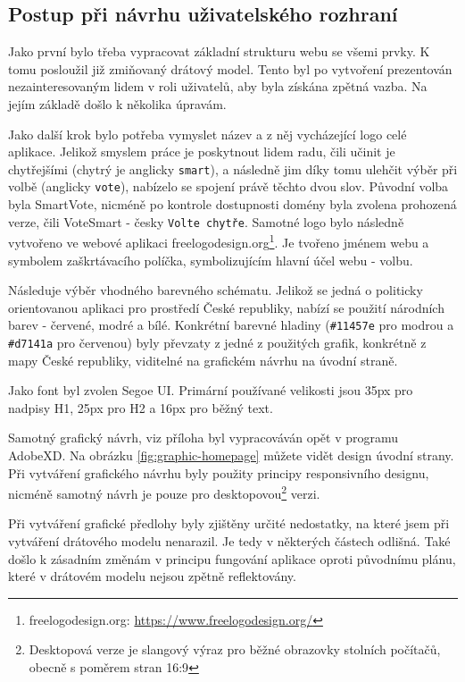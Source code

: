 \subsection{Postup při návrhu uživatelského rozhraní}
Jako první bylo třeba vypracovat základní strukturu webu se všemi prvky. K tomu posloužil již zmiňovaný drátový model. Tento byl po vytvoření prezentován nezainteresovaným lidem v roli uživatelů, aby byla získána zpětná vazba. Na jejím základě došlo k několika úpravám.
\par Jako další krok bylo potřeba vymyslet název a z něj vycházející logo celé aplikace. Jelikož smyslem práce je poskytnout lidem radu, čili učinit je chytřejšími (chytrý je anglicky \texttt{smart}), a následně jim díky tomu ulehčit výběr při volbě (anglicky \texttt{vote}), nabízelo se spojení právě těchto dvou slov. Původní volba byla SmartVote, nicméně po kontrole dostupnosti domény byla zvolena prohozená verze, čili VoteSmart - česky \texttt{Volte chytře}. Samotné logo bylo následně vytvořeno ve webové aplikaci freelogodesign.org\footnote{freelogodesign.org: \url{https://www.freelogodesign.org/}}. Je tvořeno jménem webu a symbolem zaškrtávacího políčka, symbolizujícím hlavní účel webu - volbu.
\par Následuje výběr vhodného barevného schématu. Jelikož se jedná o politicky orientovanou aplikaci pro prostředí České republiky, nabízí se použití národních barev - červené, modré a bílé. Konkrétní barevné hladiny (\texttt{\#11457e} pro modrou a \texttt{\#d7141a} pro červenou) byly převzaty z jedné z použitých grafik, konkrétně z mapy České republiky\cite{grafika-mapa}, viditelné na grafickém návrhu na úvodní straně. 
\par Jako font byl zvolen Segoe UI. Primární používané velikosti jsou 35px pro nadpisy H1, 25px pro H2 a 16px pro běžný text.
\par Samotný grafický návrh, viz příloha  byl vypracováván opět v programu AdobeXD. Na obrázku \ref{fig:graphic-homepage} můžete vidět design úvodní strany. Při vytváření grafického návrhu byly použity principy responsivního designu, nicméně samotný návrh je pouze pro desktopovou\footnote{Desktopová verze je slangový výraz pro běžné obrazovky stolních počítačů, obecně s poměrem stran 16:9} verzi. 

\par Při vytváření grafické předlohy byly zjištěny určité nedostatky, na které jsem při vytváření drátového modelu nenarazil. Je tedy v některých částech odlišná. Také došlo k zásadním změnám v principu fungování aplikace oproti původnímu plánu, které v drátovém modelu nejsou zpětně reflektovány. 


